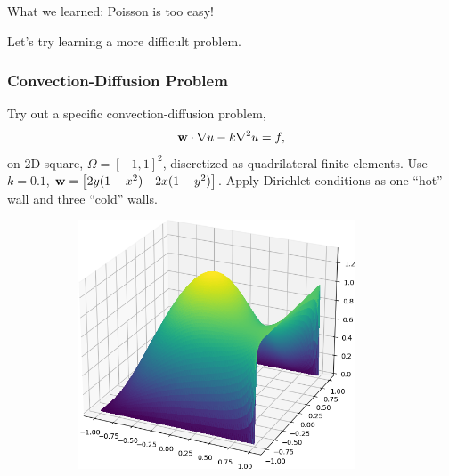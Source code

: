 \documentclass[handout]{beamer}
\renewcommand{\vec}[1]{ {\bf #1} }
\begin{document}
\begin{frame}
  What we learned: \pause Poisson is too easy!
  \newline\newline
  \pause

  Let's try learning a more difficult problem.
\end{frame}


\begin{frame}
  \frametitle{Convection-Diffusion Problem}
  Try out a specific convection-diffusion problem,
  \[\vec{w}\cdot\nabla u -k\nabla^2u = f,\]
  on 2D square, $\Omega = \left[-1,1\right]^2$, discretized as quadrilateral finite elements.  Use  $k=0.1$, $\vec{w} = \begin{bmatrix} 2y(1-x^2) & 2x(1-y^2)  \end{bmatrix}$.  Apply Dirichlet conditions as one ``hot'' wall and three ``cold'' walls.
  \begin{figure}[h]
    \begin{subfigure}{.48\textwidth}
      \includegraphics[width=0.9\textwidth]{figures/recirculating.png}
    \end{subfigure}
    \begin{subfigure}{.48\textwidth}

\end{subfigure}
\end{figure}
\end{frame}
\end{document}
